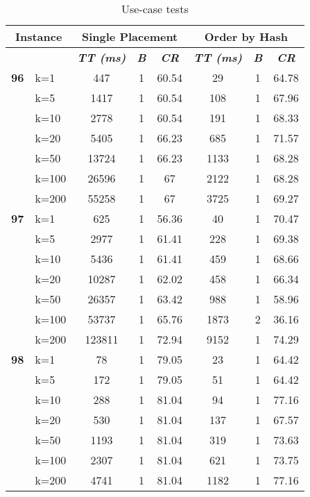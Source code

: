     \begin{table}[htbp]
    \caption{Use-case tests}
    \begin{tabular}{|l|l|c|c|c|c|c|c|}
    
    \multicolumn{ 2}{|c|}{\textbf{Instance}} & \multicolumn{ 3}{c|}{\textbf{Single Placement}} & \multicolumn{ 3}{c|}{\textbf{Order by Hash}} \\ \hline
    \multicolumn{ 2}{|l|}{} & \textbf{\textit{TT (ms)}} & \textbf{\textit{B}} & \textbf{\textit{CR}} & \textbf{\textit{TT (ms)}} & \textbf{\textit{B}} & \textbf{\textit{CR}} \\ \hline
    \multicolumn{1}{|r|}{\textbf{96}} & k=1 & 447 & 1 & 60.54 & 29 & 1 & 64.78 \\ 
     & k=5 & 1417 & 1 & 60.54 & 108 & 1 & 67.96 \\ 
     & k=10 & 2778 & 1 & 60.54 & 191 & 1 & 68.33 \\ 
     & k=20 & 5405 & 1 & 66.23 & 685 & 1 & 71.57 \\ 
     & k=50 & 13724 & 1 & 66.23 & 1133 & 1 & 68.28 \\ 
     & k=100 & 26596 & 1 & 67 & 2122 & 1 & 68.28 \\ 
     & k=200 & 55258 & 1 & 67 & 3725 & 1 & 69.27 \\ \hline
    \multicolumn{1}{|r|}{\textbf{97}} & k=1 & 625 & 1 & 56.36 & 40 & 1 & 70.47 \\ 
     & k=5 & 2977 & 1 & 61.41 & 228 & 1 & 69.38 \\ 
     & k=10 & 5436 & 1 & 61.41 & 459 & 1 & 68.66 \\ 
     & k=20 & 10287 & 1 & 62.02 & 458 & 1 & 66.34 \\ 
     & k=50 & 26357 & 1 & 63.42 & 988 & 1 & 58.96 \\ 
     & k=100 & 53737 & 1 & 65.76 & 1873 & 2 & 36.16 \\ 
     & k=200 & 123811 & 1 & 72.94 & 9152 & 1 & 74.29 \\ \hline
    \multicolumn{1}{|r|}{\textbf{98}} & k=1 & 78 & 1 & 79.05 & 23 & 1 & 64.42 \\ 
     & k=5 & 172 & 1 & 79.05 & 51 & 1 & 64.42 \\ 
     & k=10 & 288 & 1 & 81.04 & 94 & 1 & 77.16 \\ 
     & k=20 & 530 & 1 & 81.04 & 137 & 1 & 67.57 \\ 
     & k=50 & 1193 & 1 & 81.04 & 319 & 1 & 73.63 \\ 
     & k=100 & 2307 & 1 & 81.04 & 621 & 1 & 73.75 \\ 
     & k=200 & 4741 & 1 & 81.04 & 1182 & 1 & 77.16 \\ \hline

\end{tabular}
\end{table}
